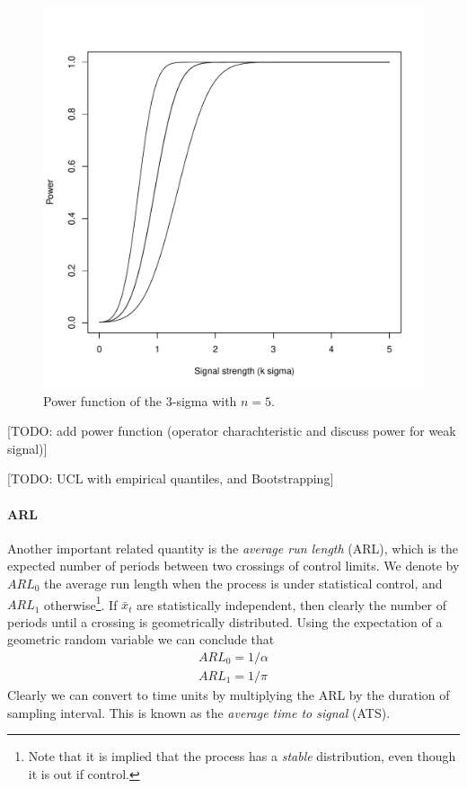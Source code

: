 \begin{figure}[h]
\centering
\includegraphics[height=0.3\textheight]{art/power_function}
\caption[Power Function]{Power function of the 3-sigma \barxChart with $n=5$.}
\label{fig:power_function}
\end{figure}





[TODO: add power function (operator charachteristic and discuss power for weak signal)]

[TODO: UCL with empirical quantiles, and Bootstrapping]

\paragraph{ARL}
Another important related quantity is the \emph{average run length} (ARL), which is the expected number of periods between two crossings of control limits. 
We denote by $ARL_0$ the average run length when the process is under statistical control, and $ARL_1$ otherwise\footnote{Note that it is implied that the process has a \emph{stable} distribution, even though it is out if control.}. 
If $\bar{x}_t$ are statistically independent, then clearly the number of periods until a crossing is geometrically distributed. Using the expectation of a geometric random variable we can conclude that 
\begin{align}
	ARL_0=1/\alpha \\
	ARL_1=1/\pi
\end{align}
Clearly we can convert to time units by multiplying the ARL by the duration of sampling interval.
This is known as the \emph{average time to signal} (ATS).


